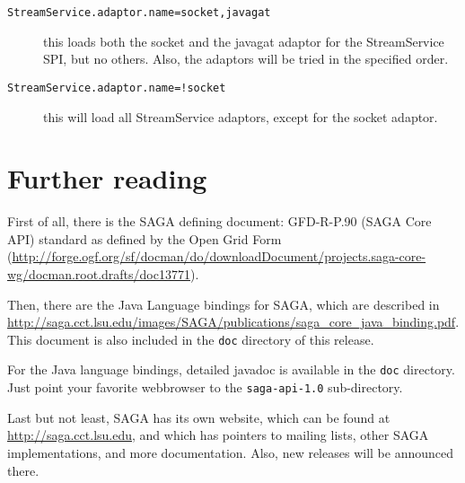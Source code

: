 \documentclass[a4paper,10pt]{article}
\begin{document}
\begin{description}

\item[\texttt{StreamService.adaptor.name=socket,javagat}]
this loads both the socket and the javagat adaptor for
the StreamService SPI, but no others. Also, the adaptors will
be tried in the specified order.

\item[\texttt{StreamService.adaptor.name=!socket}]
this will load all StreamService adaptors, except for the socket
adaptor.

\end{description}

\section{Further reading}

First of all, there is the SAGA defining document:
GFD-R-P.90 (SAGA Core API) standard as defined by the
Open Grid Form (\url{http://forge.ogf.org/sf/docman/do/downloadDocument/projects.saga-core-wg/docman.root.drafts/doc13771}).

Then, there are the Java Language bindings for SAGA, which
are described in \url{http://saga.cct.lsu.edu/images/SAGA/publications/saga_core_java_binding.pdf}. This document is also included in the
\texttt{doc} directory of this release.

For the Java language bindings, detailed javadoc is available
in the \texttt{doc} directory. Just point your favorite webbrowser
to the \texttt{saga-api-1.0} sub-directory.

Last but not least, SAGA has its own website,
which can be found at \url{http://saga.cct.lsu.edu},
and which has pointers to mailing lists, other SAGA implementations,
and more documentation. Also, new releases will be announced there.
\end{document}
